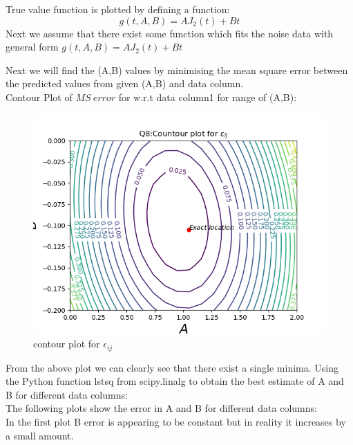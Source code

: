\documentclass[11pt, a4paper]{article}
\begin{document}
True value function is plotted by defining a function:\\
\begin{equation*}
g(t,A,B) = AJ_{2}(t)+Bt 
\end{equation*}
Next we assume that there exist some function which fits the noise data  with general form  $g(t,A,B) = AJ_{2}(t)+Bt$\\
\par
Next we will find the (A,B) values by minimising the mean square error between the predicted values from given (A,B) and data column.\\

Contour Plot of $MS\ error$ for w.r.t data column1 for range of (A,B):
\begin{figure}[!tbh]
   	\centering
   	\includegraphics[scale=0.5]{q8_plot.png}  %
   	\caption{contour plot for $\epsilon_{ij}$ }
   	\label{fig:Contour plot}
   \end{figure}

From the above plot we can clearly see that there exist a single minima.
\newpage
Using the Python function lstsq from scipy.linalg to obtain the best estimate of A and B for different data columns:\\

The following plots show the error in A and B for different data columns:\\

In the first plot B error is appearing to be constant but in reality it increases by a small amount.\\ 
\end{document}
